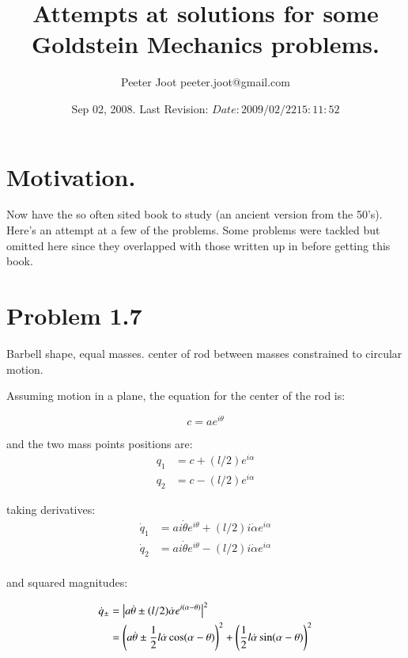 \documentclass{article}
\title{Attempts at solutions for some Goldstein Mechanics problems.}
\author{Peeter Joot \quad peeter.joot@gmail.com }
\date{ Sep 02, 2008.  Last Revision: $Date: 2009/02/22 15:11:52 $ }
\newcommand{\Abs}[1]{\left\lvert{#1}\right\rvert}
\newcommand{\qdot}[0]{\dot{q}}
\newcommand{\dotalpha}[0]{\dot{\alpha}}
\newcommand{\dottheta}[0]{\dot{\theta}}
\begin{document}
             

\maketitle{}

\section{ Motivation. }

Now have the so often sited \cite{goldstein1951cm} book to study (an ancient
version from the 50's).  Here's an attempt at a few of the problems.  Some
problems were tackled but omitted here since they overlapped with those written up in
\cite{PJTongMf1} before getting this book.

\section{ Problem 1.7 }

Barbell shape, equal masses.  center of rod between masses constrained to circular motion.

Assuming motion in a plane, the equation for the center of the rod is:

\begin{equation*}
c = a e^{i\theta}
\end{equation*}

and the two mass points positions are:
\begin{align*}
q_1 &= c + (l/2) e^{i\alpha} \\
q_2 &= c - (l/2) e^{i\alpha}
\end{align*}

taking derivatives:
\begin{align*}
\qdot_1 &= a i \dottheta e^{i\theta} + (l/2) i \dotalpha e^{i\alpha} \\
\qdot_2 &= a i \dottheta e^{i\theta} - (l/2) i \dotalpha e^{i\alpha} \\
\end{align*}

and squared magnitudes:

\begin{align*}
\qdot_{\pm}
&= \Abs{a \dottheta \pm (l/2) \dotalpha e^{i(\alpha - \theta)}}^2 \\
&= \left(a \dottheta   \pm   \inv{2} l \dotalpha \cos(\alpha - \theta)\right)^2 + \left(\inv{2} l \dotalpha \sin(\alpha - \theta)\right)^2
\end{align*}
\end{document}
